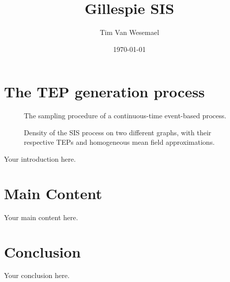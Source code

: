 \documentclass{article}
\title{Gillespie SIS}
\author{Tim Van Wesemael}
\date{\today}
\begin{document}
\maketitle

\section{The TEP generation process}
\begin{figure}
  \centering
  
  \caption{The sampling procedure of a continuous-time event-based process.}
\end{figure}

\begin{figure}
  \centering
  
  \caption{Density of the SIS process on two different graphs, with their respective TEPs and homogeneous mean field approximations.}
\end{figure}

Your introduction here.

\section{Main Content}
Your main content here.

\section{Conclusion}
Your conclusion here.
\end{document}
